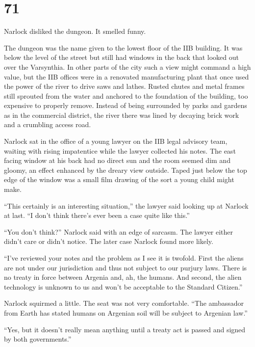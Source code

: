
\chapter{71}

Narlock disliked the dungeon. It smelled funny.

The dungeon was the name given to the lowest floor of the IIB building. It was below the level
of the street but still had windows in the back that looked out over the Varsynthia. In other
parts of the city such a view might command a high value, but the IIB offices were in a
renovated manufacturing plant that once used the power of the river to drive saws and lathes.
Rusted chutes and metal frames still sprouted from the water and anchored to the foundation of
the building, too expensive to properly remove. Instead of being surrounded by parks and gardens
as in the commercial district, the river there was lined by decaying brick work and a crumbling
access road.

Narlock sat in the office of a young lawyer on the IIB legal advisory team, waiting with rising
impatentice while the lawyer collected his notes. The east facing window at his back had no
direct sun and the room seemed dim and gloomy, an effect enhanced by the dreary view outside.
Taped just below the top edge of the window was a small film drawing of the sort a young child
might make.

``This certainly is an interesting situation,'' the lawyer said looking up at Narlock at last.
``I don't think there's ever been a case quite like this.''

``You don't think?'' Narlock said with an edge of sarcasm. The lawyer either didn't care or
didn't notice. The later case Narlock found more likely.

``I've reviewed your notes and the problem as I see it is twofold. First the aliens are not
under our jurisdiction and thus not subject to our purjury laws. There is no treaty in force
between Argenia and, ah, the humans. And second, the alien technology is unknown to us and won't
be acceptable to the Standard Citizen.''

Narlock squirmed a little. The seat was not very comfortable. ``The ambassador from Earth has
stated humans on Argenian soil will be subject to Argenian law.''

``Yes, but it doesn't really mean anything until a treaty act is passed and signed by both
governments.''

